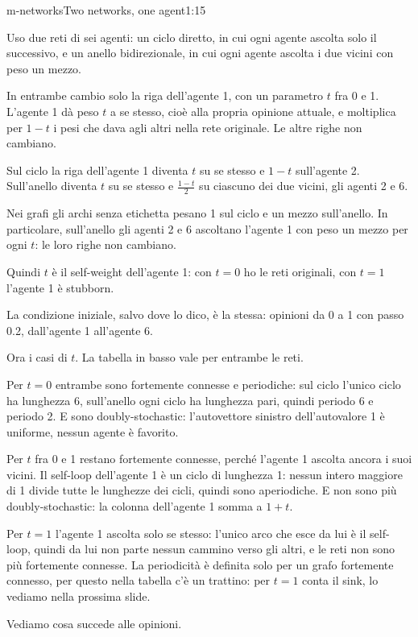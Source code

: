 \begin{slidedue}{m-networks}{Two networks, one agent}{1:15}
  \begin{discorso}
    \item Uso due reti di sei agenti: un ciclo diretto, in cui ogni agente ascolta solo il successivo, e un anello bidirezionale, in cui ogni agente ascolta i due vicini con peso un mezzo.
    \item In entrambe cambio solo la riga dell'agente 1, con un parametro $t$ fra 0 e 1. L'agente 1 dà peso $t$ a se stesso, cioè alla propria opinione attuale, e moltiplica per $1-t$ i pesi che dava agli altri nella rete originale. Le altre righe non cambiano.
    \item Sul ciclo la riga dell'agente 1 diventa $t$ su se stesso e $1-t$ sull'agente 2. Sull'anello diventa $t$ su se stesso e $\frac{1-t}{2}$ su ciascuno dei due vicini, gli agenti 2 e 6.
    \item Nei grafi gli archi senza etichetta pesano 1 sul ciclo e un mezzo sull'anello. In particolare, sull'anello gli agenti 2 e 6 ascoltano l'agente 1 con peso un mezzo per ogni $t$: le loro righe non cambiano.
    \item Quindi $t$ è il self-weight dell'agente 1: con $t=0$ ho le reti originali, con $t=1$ l'agente 1 è stubborn.
    \item La condizione iniziale, salvo dove lo dico, è la stessa: opinioni da 0 a 1 con passo 0.2, dall'agente 1 all'agente 6.
    \item \clic Ora i casi di $t$. La tabella in basso vale per entrambe le reti.
    \item Per $t=0$ entrambe sono fortemente connesse e periodiche: sul ciclo l'unico ciclo ha lunghezza 6, sull'anello ogni ciclo ha lunghezza pari, quindi periodo 6 e periodo 2. E sono doubly-stochastic: l'autovettore sinistro dell'autovalore 1 è uniforme, nessun agente è favorito.
    \item Per $t$ fra 0 e 1 restano fortemente connesse, perché l'agente 1 ascolta ancora i suoi vicini. Il self-loop dell'agente 1 è un ciclo di lunghezza 1: nessun intero maggiore di 1 divide tutte le lunghezze dei cicli, quindi sono aperiodiche. E non sono più doubly-stochastic: la colonna dell'agente 1 somma a $1+t$.
    \item Per $t=1$ l'agente 1 ascolta solo se stesso: l'unico arco che esce da lui è il self-loop, quindi da lui non parte nessun cammino verso gli altri, e le reti non sono più fortemente connesse. La periodicità è definita solo per un grafo fortemente connesso, per questo nella tabella c'è un trattino: per $t=1$ conta il sink, lo vediamo nella prossima slide.
    \item Vediamo cosa succede alle opinioni.
  \end{discorso}
\end{slidedue}

